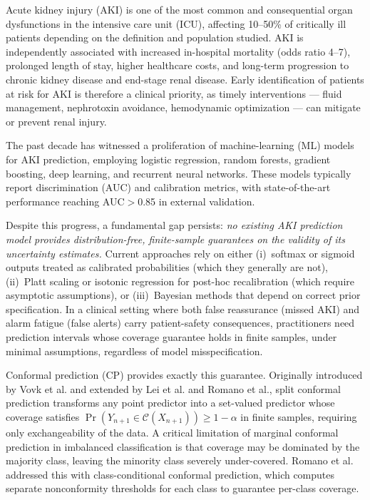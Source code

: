 \documentclass[12pt]{article}
\begin{document}
Acute kidney injury (AKI) is one of the most common and
consequential organ dysfunctions in the intensive care unit
(ICU), affecting 10--50\% of critically ill patients depending
on the definition and population studied.\cite{hoste2015epidemiology,kellum2021acute}
AKI is independently associated with increased in-hospital
mortality (odds ratio 4--7), prolonged length of stay, higher
healthcare costs, and long-term progression to chronic kidney
disease and end-stage renal disease.\cite{chawla2017acute,siew2020biological}
Early identification of patients at risk for AKI is therefore a
clinical priority, as timely interventions --- fluid management,
nephrotoxin avoidance, hemodynamic optimization --- can mitigate
or prevent renal injury.\cite{meersch2017prevention}

The past decade has witnessed a proliferation of machine-learning
(ML) models for AKI prediction, employing logistic
regression,\cite{koyner2018development} random
forests,\cite{kate2020prediction} gradient
boosting,\cite{churpek2020machine} deep
learning,\cite{tomasev2019clinically} and recurrent neural
networks.\cite{li2021prediction}  These models typically report
discrimination (AUC) and calibration metrics, with
state-of-the-art performance reaching AUC${}>{}$0.85 in
external validation.\cite{wilson2022machine}

Despite this progress, a fundamental gap persists: \textit{no
existing AKI prediction model provides distribution-free,
finite-sample guarantees on the validity of its uncertainty
estimates.}  Current approaches rely on either (i)~softmax or
sigmoid outputs treated as calibrated probabilities (which they
generally are not\cite{guo2017calibration}), (ii)~Platt scaling
or isotonic regression for post-hoc recalibration (which require
asymptotic assumptions\cite{niculescu2005predicting}), or
(iii)~Bayesian methods that depend on correct prior
specification.\cite{jospin2022hands}  In a clinical setting
where both false reassurance (missed AKI) and alarm fatigue
(false alerts) carry patient-safety consequences, practitioners
need prediction intervals whose coverage guarantee holds in
finite samples, under minimal assumptions, regardless of model
misspecification.

Conformal prediction (CP) provides exactly this guarantee.
Originally introduced by Vovk et al.\cite{vovk2005algorithmic}
and extended by Lei et al.\cite{lei2018distribution} and
Romano et al.,\cite{romano2019conformalized} split conformal
prediction transforms any point predictor into a set-valued
predictor whose coverage satisfies
$\Pr(Y_{n+1} \in \mathcal{C}(X_{n+1})) \geq 1 - \alpha$ in
finite samples, requiring only exchangeability of the data.
A critical limitation of marginal conformal prediction in
imbalanced classification is that coverage may be dominated by
the majority class, leaving the minority class severely
under-covered.  Romano et al.\cite{romano2020classification}
addressed this with class-conditional conformal prediction,
which computes separate nonconformity thresholds for each class
to guarantee per-class coverage.
\end{document}
